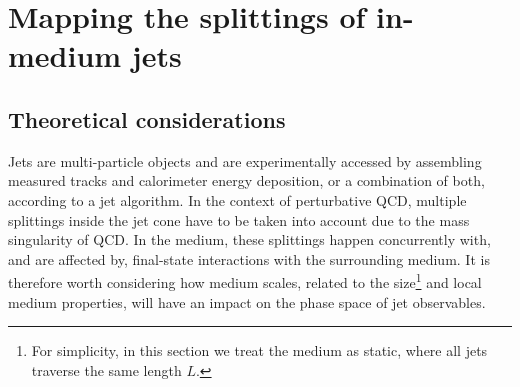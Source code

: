 
\section{Mapping the splittings of in-medium jets}
\label{sec:phasespace}


\subsection{Theoretical considerations}
\label{sec:phasespace-theory}


Jets are multi-particle objects and are experimentally accessed by assembling measured tracks and calorimeter energy deposition, or a combination of both, according to a jet algorithm. In the context of perturbative QCD, multiple splittings inside the jet cone have to be taken into account due to the mass singularity of QCD. 
In the medium, these splittings happen concurrently with, and are affected by, final-state interactions with the surrounding medium. It is therefore worth considering how medium scales, related to the size\footnote{For simplicity, in this section we treat the medium as static, where all jets traverse the same length $L$.} and local medium properties, will have an impact on the phase space of jet observables. 

